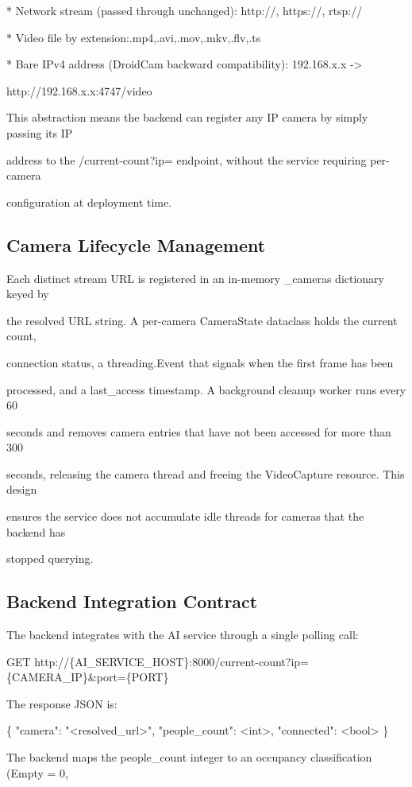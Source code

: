 * Network stream (passed through unchanged): http://, https://, rtsp://

* Video file by extension:.mp4,.avi,.mov,.mkv,.flv,.ts

* Bare IPv4 address (DroidCam backward compatibility): 192.168.x.x ->

http://192.168.x.x:4747/video

This abstraction means the backend can register any IP camera by simply passing its IP

address to the /current-count?ip= endpoint, without the service requiring per-camera

configuration at deployment time.


\subsection{Camera Lifecycle Management}
Each distinct stream URL is registered in an in-memory \_cameras dictionary keyed by

the resolved URL string. A per-camera CameraState dataclass holds the current count,

connection status, a threading.Event that signals when the first frame has been

processed, and a last\_access timestamp. A background cleanup worker runs every 60

seconds and removes camera entries that have not been accessed for more than 300

seconds, releasing the camera thread and freeing the VideoCapture resource. This design

ensures the service does not accumulate idle threads for cameras that the backend has

stopped querying.


\subsection{Backend Integration Contract}
The backend integrates with the AI service through a single polling call:

GET http://\{AI\_SERVICE\_HOST\}:8000/current-count?ip=\{CAMERA\_IP\}\&port=\{PORT\}

The response JSON is:

\{ "camera": "<resolved\_url>", "people\_count": <int>, "connected": <bool> \}

The backend maps the people\_count integer to an occupancy classification (Empty = 0,

